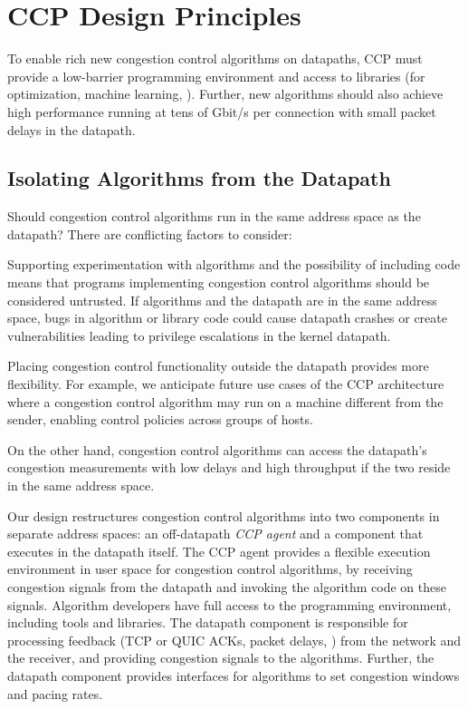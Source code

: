 \section{CCP Design Principles}
\label{s:design}

To enable rich new congestion control algorithms on datapaths,
CCP must provide a low-barrier programming environment and access
to libraries (\eg for optimization, machine learning, \etc).
%
Further, new algorithms should also achieve high performance running at tens of
Gbit/s per connection with small packet delays in the datapath.

\subsection{Isolating Algorithms from the Datapath}
\label{s:datapath:isolation}
Should congestion control algorithms run in the same address space as the
datapath? There are conflicting factors to consider:

 Supporting experimentation with algorithms and the possibility of
including \userspace code means that programs implementing congestion
control algorithms should be considered untrusted. If algorithms and the
datapath are in the same address space, bugs in algorithm or library code could
cause datapath crashes or create vulnerabilities leading to privilege
escalations in the kernel datapath.

 Placing congestion control functionality outside the datapath provides more flexibility. For example, we anticipate future use cases of the CCP architecture where
a congestion control algorithm may run on a machine different from the sender,
enabling control policies across groups of hosts.

 On the other hand, congestion control algorithms can access the datapath's
congestion measurements with low delays and high throughput if the two reside in
the same address space.

\smallskip
Our design restructures congestion control algorithms into two components in
separate address spaces: an off-datapath {\em CCP agent} and a component that
executes in the datapath itself.
%
The CCP agent provides a flexible execution environment in user space for congestion control algorithms, by receiving congestion signals from the datapath
and invoking the algorithm code on these signals.
%
Algorithm developers have full access to the \userspace programming environment, including tools and libraries.
%
The datapath component is responsible for processing feedback (\eg TCP or QUIC
ACKs, packet delays, \etc) from the network and the receiver, and providing congestion signals to the algorithms.
%
Further, the datapath component provides interfaces for algorithms to set
congestion windows and pacing rates.

